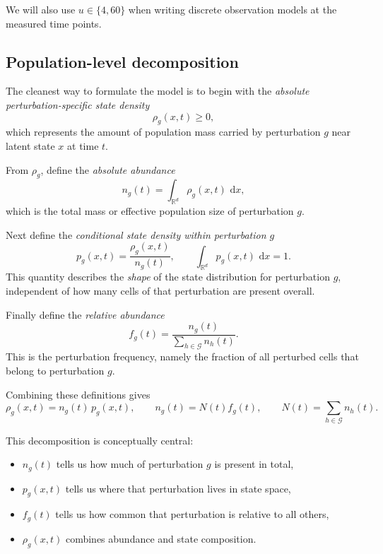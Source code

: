 \documentclass[11pt]{article}
\newcommand{\R}{\mathbb{R}}
\newcommand{\G}{\mathcal{G}}
\newcommand{\1}{\mathbf{1}}
\newcommand{\dd}{\,\mathrm{d}}
\theoremstyle{plain}
\begin{document}
We will also use $u \in \{4,60\}$ when writing discrete observation models at the measured time points.

\subsection{Population-level decomposition}

The cleanest way to formulate the model is to begin with the \emph{absolute perturbation-specific state density}
\begin{equation}
\rho_g(x,t) \ge 0,
\end{equation}
which represents the amount of population mass carried by perturbation $g$ near latent state $x$ at time $t$.

From $\rho_g$, define the \emph{absolute abundance}
\begin{equation}
 n_g(t) = \int_{\R^d} \rho_g(x,t)\,\dd x,
 \label{eq:abs_abundance}
\end{equation}
which is the total mass or effective population size of perturbation $g$.

Next define the \emph{conditional state density within perturbation $g$}
\begin{equation}
 p_g(x,t) = \frac{\rho_g(x,t)}{n_g(t)},
 \qquad \int_{\R^d} p_g(x,t)\,\dd x = 1.
 \label{eq:conditional_density}
\end{equation}
This quantity describes the \emph{shape} of the state distribution for perturbation $g$, independent of how many cells of that perturbation are present overall.

Finally define the \emph{relative abundance}
\begin{equation}
 f_g(t) = \frac{n_g(t)}{\sum_{h\in\G} n_h(t)}.
 \label{eq:relative_abundance}
\end{equation}
This is the perturbation frequency, namely the fraction of all perturbed cells that belong to perturbation $g$.

Combining these definitions gives
\begin{equation}
\rho_g(x,t) = n_g(t)\,p_g(x,t),
\qquad
n_g(t) = N(t)f_g(t),
\qquad
N(t)=\sum_{h\in\G} n_h(t).
\label{eq:rho_factorization}
\end{equation}

This decomposition is conceptually central:
\begin{itemize}
    \item $n_g(t)$ tells us how much of perturbation $g$ is present in total,
    \item $p_g(x,t)$ tells us where that perturbation lives in state space,
    \item $f_g(t)$ tells us how common that perturbation is relative to all others,
    \item $\rho_g(x,t)$ combines abundance and state composition.
\end{itemize}
\end{document}
